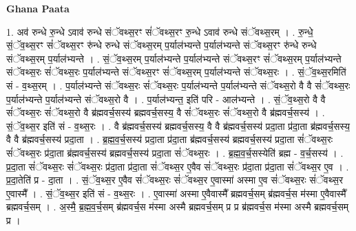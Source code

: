 \documentclass[17pt]{extarticle}
\begin{document}
\textbf{Ghana Paata } \newline

1. अव॑ रुन्धे रु॒न्धे ऽवाव॑ रुन्धे संॅवथ्स॒रꣳ सं॑ॅवथ्स॒रꣳ रु॒न्धे ऽवाव॑ रुन्धे संॅवथ्स॒रम् । . रु॒न्धे॒ सं॒ॅव॒थ्स॒रꣳ सं॑ॅवथ्स॒रꣳ रु॑न्धे रुन्धे संॅवथ्स॒रम् प॒र्याल॑भ्यन्ते प॒र्याल॑भ्यन्ते संॅवथ्स॒रꣳ रु॑न्धे रुन्धे संॅवथ्स॒रम् प॒र्याल॑भ्यन्ते । . सं॒ॅव॒थ्स॒रम् प॒र्याल॑भ्यन्ते प॒र्याल॑भ्यन्ते संॅवथ्स॒रꣳ सं॑ॅवथ्स॒रम् प॒र्याल॑भ्यन्ते संॅवथ्स॒रः सं॑ॅवथ्स॒रः प॒र्याल॑भ्यन्ते संॅवथ्स॒रꣳ सं॑ॅवथ्स॒रम् प॒र्याल॑भ्यन्ते संॅवथ्स॒रः । . सं॒ॅव॒थ्स॒रमिति॑ सं - व॒थ्स॒रम् । . प॒र्याल॑भ्यन्ते संॅवथ्स॒रः सं॑ॅवथ्स॒रः प॒र्याल॑भ्यन्ते प॒र्याल॑भ्यन्ते संॅवथ्स॒रो वै वै सं॑ॅवथ्स॒रः प॒र्याल॑भ्यन्ते प॒र्याल॑भ्यन्ते संॅवथ्स॒रो वै । . प॒र्याल॑भ्यन्त॒ इति॑ परि - आल॑भ्यन्ते । . सं॒ॅव॒थ्स॒रो वै वै सं॑ॅवथ्स॒रः सं॑ॅवथ्स॒रो वै ब्र॑ह्मवर्च॒सस्य॑ ब्रह्मवर्च॒सस्य॒ वै सं॑ॅवथ्स॒रः सं॑ॅवथ्स॒रो वै ब्र॑ह्मवर्च॒सस्य॑ । . सं॒ॅव॒थ्स॒र इति॑ सं - व॒थ्स॒रः । . वै ब्र॑ह्मवर्च॒सस्य॑ ब्रह्मवर्च॒सस्य॒ वै वै ब्र॑ह्मवर्च॒सस्य॑ प्रदा॒ता प्र॑दा॒ता ब्र॑ह्मवर्च॒सस्य॒ वै वै ब्र॑ह्मवर्च॒सस्य॑ प्रदा॒ता । . ब्र॒ह्म॒व॒र्च॒सस्य॑ प्रदा॒ता प्र॑दा॒ता ब्र॑ह्मवर्च॒सस्य॑ ब्रह्मवर्च॒सस्य॑ प्रदा॒ता सं॑ॅवथ्स॒रः सं॑ॅवथ्स॒रः प्र॑दा॒ता ब्र॑ह्मवर्च॒सस्य॑ ब्रह्मवर्च॒सस्य॑ प्रदा॒ता सं॑ॅवथ्स॒रः । . ब्र॒ह्म॒व॒र्च॒सस्येति॑ ब्रह्म - व॒र्च॒सस्य॑ । . प्र॒दा॒ता सं॑ॅवथ्स॒रः सं॑ॅवथ्स॒रः प्र॑दा॒ता प्र॑दा॒ता सं॑ॅवथ्स॒र ए॒वैव सं॑ॅवथ्स॒रः प्र॑दा॒ता प्र॑दा॒ता सं॑ॅवथ्स॒र ए॒व । . प्र॒दा॒तेति॑ प्र - दा॒ता । . सं॒ॅव॒थ्स॒र ए॒वैव सं॑ॅवथ्स॒रः सं॑ॅवथ्स॒र ए॒वास्मा॑ अस्मा ए॒व सं॑ॅवथ्स॒रः सं॑ॅवथ्स॒र ए॒वास्मै᳚ । . सं॒ॅव॒थ्स॒र इति॑ सं - व॒थ्स॒रः । . ए॒वास्मा॑ अस्मा ए॒वैवास्मै᳚ ब्रह्मवर्च॒सम् ब्र॑ह्मवर्च॒स म॑स्मा ए॒वैवास्मै᳚ ब्रह्मवर्च॒सम् । . अ॒स्मै॒ ब्र॒ह्म॒व॒र्च॒सम् ब्र॑ह्मवर्च॒स म॑स्मा अस्मै ब्रह्मवर्च॒सम् प्र प्र ब्र॑ह्मवर्च॒स म॑स्मा अस्मै ब्रह्मवर्च॒सम् प्र । \newline
\end{document}

